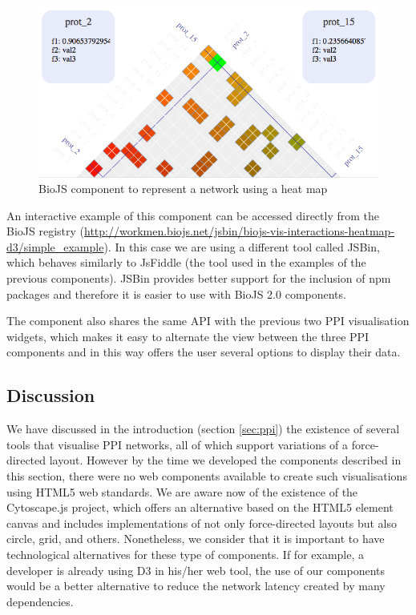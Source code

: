 \begin{figure}[ht]
\centering
\includegraphics[width=\textwidth]{figures/heatmap.png}
\caption[BioJS component to represent a network using a heat map]{BioJS component to represent a network using a heat map
\label{fig:biojs_heatmap}}
\end{figure}

An interactive example of this component can be accessed directly from the BioJS registry (\url{http://workmen.biojs.net/jsbin/biojs-vis-interactions-heatmap-d3/simple_example}). In this case we are using a different tool called JSBin, which behaves similarly to JsFiddle (the tool used in the examples of the previous components). JSBin provides better support for the inclusion of npm packages and therefore it is easier to use with BioJS 2.0 components.

The component also shares the same API with the previous two PPI visualisation widgets, which makes it easy to alternate the view between the three PPI components and in this way offers the user several options to display their data.


\subsection{Discussion}
We have discussed in the introduction (section \ref{sec:ppi}) the existence of several tools that visualise PPI networks, all of which support variations of a force-directed layout. However by the time we developed the components described in this section, there were no web components available to create such visualisations using HTML5 web standards. We are aware now of the existence of the Cytoscape.js project, which offers an alternative based on the HTML5 element canvas and includes implementations of not only force-directed layouts but also circle, grid, and others. Nonetheless, we consider that it is important to have technological alternatives for these type of components. If for example, a developer is already using D3 in his/her web tool, the use of our components would be a better alternative to reduce the network latency created by many dependencies.

